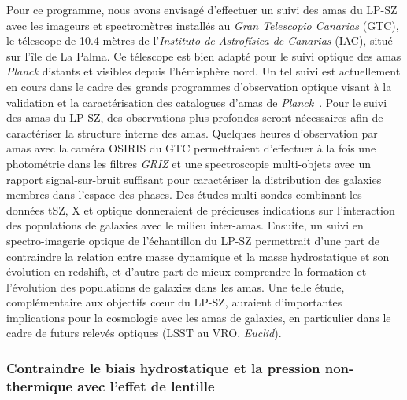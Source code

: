 Pour ce programme, nous avons envisagé d'effectuer un suivi des amas
du LP-SZ avec les imageurs et spectromètres installés au \emph{Gran
  Telescopio Canarias} (GTC), le télescope de 10.4 mètres de
l'\emph{Instituto de Astrofísica de Canarias} (IAC), situé sur l'île
de La Palma. Ce télescope est bien adapté pour le suivi optique des
amas \emph{Planck} distants et visibles depuis l'hémisphère
nord. Un tel suivi est actuellement en cours dans le cadre des grands
programmes d'observation optique visant à la validation et la
caractérisation des catalogues d'amas de
\emph{Planck}~\citep{Barrena2018,Streblyanska2019,Aguado-Barahona2019}.
Pour le suivi des amas du LP-SZ, des observations plus profondes
seront nécessaires afin de caractériser la structure interne des
amas. Quelques heures d'observation par amas avec la caméra OSIRIS du
GTC permettraient d'effectuer à la fois une photométrie dans les
filtres \emph{GRIZ} et une spectroscopie multi-objets avec un rapport
signal-sur-bruit suffisant pour caractériser la distribution des
galaxies membres dans l'espace des phases. Des études multi-sondes
combinant les données tSZ, X et optique donneraient de précieuses
indications sur l'interaction des populations de galaxies avec le
milieu inter-amas. Ensuite, un suivi en spectro-imagerie optique de
l'échantillon du LP-SZ permettrait d'une part de contraindre la
relation entre masse dynamique et la masse hydrostatique et son
évolution en redshift, et d'autre part de mieux comprendre la
formation et l'évolution des populations de galaxies dans les amas.
Une telle étude, complémentaire aux objectifs c\oe ur du LP-SZ,
auraient d'importantes implications pour la cosmologie avec les amas
de galaxies, en particulier dans le cadre de futurs relevés optiques
(LSST au VRO, \emph{Euclid}). 


\subsubsection{Contraindre le biais hydrostatique et la pression
  non-thermique avec l'effet de lentille}

